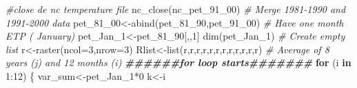 \documentclass[
  10pt,
  b5paper,
]{book}
\newenvironment{Shaded}{\begin{snugshade}}{\end{snugshade}}
\newcommand{\AttributeTok}[1]{\textcolor[rgb]{0.77,0.63,0.00}{#1}}
\newcommand{\CommentTok}[1]{\textcolor[rgb]{0.56,0.35,0.01}{\textit{#1}}}
\newcommand{\ControlFlowTok}[1]{\textcolor[rgb]{0.13,0.29,0.53}{\textbf{#1}}}
\newcommand{\DecValTok}[1]{\textcolor[rgb]{0.00,0.00,0.81}{#1}}
\newcommand{\DocumentationTok}[1]{\textcolor[rgb]{0.56,0.35,0.01}{\textbf{\textit{#1}}}}
\newcommand{\FunctionTok}[1]{\textcolor[rgb]{0.00,0.00,0.00}{#1}}
\newcommand{\NormalTok}[1]{#1}
\newcommand{\OtherTok}[1]{\textcolor[rgb]{0.56,0.35,0.01}{#1}}
\newcommand{\SpecialCharTok}[1]{\textcolor[rgb]{0.00,0.00,0.00}{#1}}
\begin{document}
\begin{Shaded}
\begin{Highlighting}[]
 \CommentTok{\#close de nc temperature file}
 \FunctionTok{nc\_close}\NormalTok{(nc\_pet\_91\_00) }
 \CommentTok{\# Merge 1981{-}1990 and 1991{-}2000 data }
\NormalTok{ pet\_81\_00}\OtherTok{\textless{}{-}}\FunctionTok{abind}\NormalTok{(pet\_81\_90,pet\_91\_00)}
\CommentTok{\# Have one month ETP ( January)}
\NormalTok{ pet\_Jan\_1}\OtherTok{\textless{}{-}}\NormalTok{pet\_81\_90[,,}\DecValTok{1}\NormalTok{]}
 \FunctionTok{dim}\NormalTok{(pet\_Jan\_1) }
 \CommentTok{\# Create empty list}
\NormalTok{r}\OtherTok{\textless{}{-}}\FunctionTok{raster}\NormalTok{(}\AttributeTok{ncol=}\DecValTok{3}\NormalTok{,}\AttributeTok{nrow=}\DecValTok{3}\NormalTok{)}
\NormalTok{Rlist}\OtherTok{\textless{}{-}}\FunctionTok{list}\NormalTok{(r,r,r,r,r,r,r,r,r,r,r,r)}
 \CommentTok{\# Average of 8 years (j)  and 12 months (i) }
\DocumentationTok{\#\#\#\#\#\#for loop starts\#\#\#\#\#\#\#}
 \ControlFlowTok{for}\NormalTok{ (i }\ControlFlowTok{in} \DecValTok{1}\SpecialCharTok{:}\DecValTok{12}\NormalTok{) \{ }
\NormalTok{var\_sum}\OtherTok{\textless{}{-}}\NormalTok{pet\_Jan\_1}\SpecialCharTok{*}\DecValTok{0}
\NormalTok{k}\OtherTok{\textless{}{-}}\NormalTok{i}
 

\end{Highlighting}
\end{Shaded}
\end{document}
